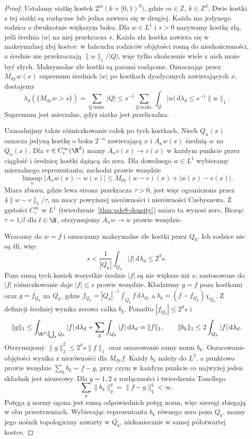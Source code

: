 \begin{proof}
Ustalamy siatkę kostek $2^m(k+[0,1)^d)$,
gdzie $m\in\mathbb Z$, $k\in\mathbb Z^d$.
Dwie kostki z tej siatki są rozłączne lub jedna
zawiera się w drugiej. Każda ma jedynego rodzica
o dwukrotnie większym boku. Dla $w\in L^1$
i $s>0$ nazywamy kostkę złą, jeśli średnia $|w|$
na niej przekracza $s$. Każda zła kostka zawiera
się w maksymalnej złej kostce: w łańcuchu rodziców
objętości rosną do nieskończoności, a średnie
nie przekraczają $\|w\|_1/|Q|$, więc tylko skończenie
wiele z nich może być złych. Maksymalne złe kostki
są parami rozłączne. Oznaczając przez $M_{\mathrm{dy}}w(x)$
supremum średnich $|w|$ po kostkach dyadycznych
zawierających $x$, dostajemy
\[
 \lambda_d(\{M_{\mathrm{dy}}w>s\})
 =\sum_{Q\ \mathrm{maks.}}|Q|
 \le s^{-1}\sum_{Q\ \mathrm{maks.}}\int_Q|w|\,\mathrm d\lambda_d
 \le s^{-1}\|w\|_1.
\]
Supremum jest mierzalne, gdyż siatka jest przeliczalna.

Uzasadnijmy także różniczkowanie całek po tych kostkach.
Niech $Q_n(x)$ oznacza jedyną kostkę o boku $2^{-n}$
zawierającą $x$ i $A_n w(x)$ średnią $w$ na $Q_n(x)$.
Dla $v\in C_c^\infty(\R^d)$ mamy $A_nv(x)\to v(x)$
w każdym punkcie przez ciągłość i średnicę kostki dążącą
do zera. Dla dowolnego $w\in L^1$ wybieramy
mierzalnego reprezentanta; zachodzi prawie wszędzie
\[
 \limsup_n |A_nw(x)-w(x)|
 \le M_{\mathrm{dy}}(w-v)(x)+|w(x)-v(x)|.
\]
Miara zbioru, gdzie lewa strona przekracza $\tau>0$,
jest więc ograniczona przez $4\|w-v\|_1/\tau$,
na mocy powyższej nierówności i nierówności Czebyszewa.
Z gęstości $C_c^\infty$ w $L^1$
(twierdzenie~\ref{thm:pde8-density}) miara ta wynosi zero.
Biorąc $\tau=1/l$ dla $l\in\N$, otrzymujemy
$A_nw\to w$ prawie wszędzie.

Wracamy do $w=f$ i oznaczamy maksymalne złe kostki
przez $Q_k$. Ich rodzice nie są źli, więc
\[
 s<\frac1{|Q_k|}\int_{Q_k}|f|\,\mathrm d\lambda_d
 \le 2^ds.
\]
Poza sumą tych kostek wszystkie średnie $|f|$ są
nie większe niż $s$; zastosowane do $|f|$ różniczkowanie
daje $|f|\le s$ prawie wszędzie. Kładziemy
$g=f$ poza kostkami oraz $g=f_{Q_k}$ na $Q_k$, gdzie
$f_{Q_k}=|Q_k|^{-1}\int_{Q_k}f\,\mathrm d\lambda_d$,
a $b_k=(f-f_{Q_k})\chi_{Q_k}$.
Z definicji średniej wynika zerowa całka $b_k$.
Ponadto $|f_{Q_k}|\le 2^ds$ i
\[
 \|g\|_1
 \le\int_{\R^d\setminus\bigcup_k Q_k}|f|\,\mathrm d\lambda_d
    +\sum_k\int_{Q_k}|f|\,\mathrm d\lambda_d
 =\|f\|_1,\qquad
 \|b_k\|_1\le2\int_{Q_k}|f|\,\mathrm d\lambda_d.
\]
Otrzymujemy $\|g\|_2^2\le2^ds\|f\|_1$ oraz
oszacowanie sumy norm $b_k$. Oszacowanie objętości
wynika z nierówności dla $M_{\mathrm{dy}}f$.
Każdy $b_k$ należy do $L^2$, a punktowo prawie wszędzie
$\sum_k b_k=f-g$, przy czym w każdym punkcie co najwyżej
jeden składnik jest niezerowy.
Dla $q=1,2$ z rozłączności i twierdzenia Tonellego
\[
 \sum_k\|b_k\|_q^q=\|f-g\|_q^q<\infty .
\]
Potęga $q$ normy ogona jest sumą odpowiednich potęg
norm, więc szeregi zbiegają w obu przestrzeniach.
Wybierając reprezentanta $b_k$ równego zero poza $Q_k$,
mamy jego nośnik topologiczny zawarty w $\overline{Q_k}$,
niekoniecznie w samej półotwartej kostce.
\end{proof}

